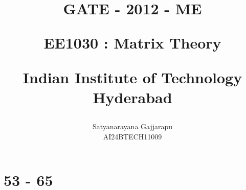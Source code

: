 \documentclass[journal]{IEEEtran}
\begin{document}

\vspace{3cm}




\title{
GATE - 2012 - ME

\large{EE1030 : Matrix Theory}

Indian Institute of Technology Hyderabad
}
\author{Satyanarayana Gajjarapu

AI24BTECH11009
}	





\maketitle




\bigskip

\renewcommand{\thefigure}{\theenumi}
\renewcommand{\thetable}{\theenumi}


\section{53 - 65}
\end{document}

